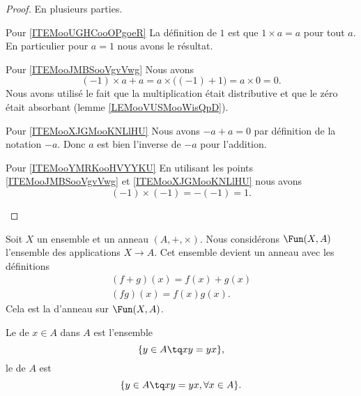 \begin{proof}
    En plusieurs parties.
    \begin{subproof}
    \item[Pour \ref{ITEMooUGHCooOPgoeR}]
        La définition de \( 1\) est que \( 1\times a=a\) pour tout \( a\). En particulier pour \( a=1\) nous avons le résultat.
    \item[Pour \ref{ITEMooJMBSooVgvVwg}]
    Nous avons
    \begin{equation}
        (-1)\times a + a= a\times \big( (-1)+1 \big)=a\times 0=0.
    \end{equation}
    Nous avons utilisé le fait que la multiplication était distributive et que le zéro était absorbant (lemme \ref{LEMooVUSMooWisQpD}).

\item[Pour \ref{ITEMooXJGMooKNLlHU}]
    Nous avons \( -a+a=0\) par définition de la notation \( -a\). Donc \( a\) est bien l'inverse de \( -a\) pour l'addition.

\item[Pour \ref{ITEMooYMRKooHVYYKU}]
    En utilisant les points \ref{ITEMooJMBSooVgvVwg} et \ref{ITEMooXJGMooKNLlHU} nous avons
    \begin{equation}
        (-1)\times (-1)=-(-1)=1.
    \end{equation}
    \end{subproof}
\end{proof}

Soit \( X\) un ensemble et un anneau $(A, +, \times)$. Nous considérons \( \Fun(X,A)\) l'ensemble des applications \( X\to A\). Cet ensemble devient un anneau avec les définitions
\begin{subequations}
    \begin{align}
        (f+g)(x)=f(x)+g(x)\\
        (fg)(x)=f(x)g(x).
    \end{align}
\end{subequations}
Cela est la  d'anneau sur \( \Fun(X,A)\).

\begin{definition}
    Le  de \( x\in A\) dans \( A\) est l'ensemble
    \begin{equation}
        \{ y\in A\tq xy=yx \},
    \end{equation}
    le  de \( A\) est
    \begin{equation}
        \{ y\in A\tq xy=yx,\forall x\in A \}.
    \end{equation}
\end{definition}

